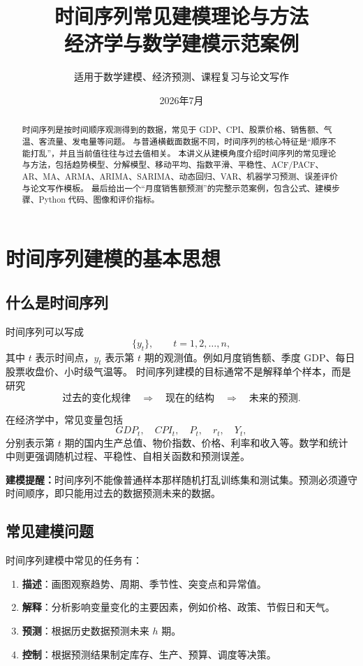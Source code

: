 \documentclass[11pt,a4paper]{ctexart}
\title{\bfseries 时间序列常见建模理论与方法\\\large 经济学与数学建模示范案例}
\author{适用于数学建模、经济预测、课程复习与论文写作}
\date{2026年7月}
\newcommand{\important}[1]{\noindent\colorbox{blue!6}{\parbox{0.97\linewidth}{#1}}}
\newcommand{\term}[1]{\textbf{#1}}
\begin{document}
\maketitle
\begin{abstract}
时间序列是按时间顺序观测得到的数据，常见于 GDP、CPI、股票价格、销售额、气温、客流量、发电量等问题。
与普通横截面数据不同，时间序列的核心特征是“顺序不能打乱”，并且当前值往往与过去值相关。
本讲义从建模角度介绍时间序列的常见理论与方法，包括趋势模型、分解模型、移动平均、指数平滑、平稳性、ACF/PACF、AR、MA、ARMA、ARIMA、SARIMA、动态回归、VAR、机器学习预测、误差评价与论文写作模板。
最后给出一个“月度销售额预测”的完整示范案例，包含公式、建模步骤、Python 代码、图像和评价指标。
\end{abstract}
\tableofcontents
\newpage

\section{时间序列建模的基本思想}
\subsection{什么是时间序列}
时间序列可以写成
\[
\{y_t\},\qquad t=1,2,\ldots,n,
\]
其中 $t$ 表示时间点，$y_t$ 表示第 $t$ 期的观测值。例如月度销售额、季度 GDP、每日股票收盘价、小时级气温等。
时间序列建模的目标通常不是解释单个样本，而是研究
\[
\text{过去的变化规律}\quad \Longrightarrow \quad \text{现在的结构}\quad \Longrightarrow \quad \text{未来的预测}.
\]

在经济学中，常见变量包括
\[
GDP_t,\quad CPI_t,\quad P_t,\quad r_t,\quad Y_t,
\]
分别表示第 $t$ 期的国内生产总值、物价指数、价格、利率和收入等。数学和统计中则更强调随机过程、平稳性、自相关函数和预测误差。

\important{\textbf{建模提醒：}时间序列不能像普通样本那样随机打乱训练集和测试集。预测必须遵守时间顺序，即只能用过去的数据预测未来的数据。}

\subsection{常见建模问题}
时间序列建模中常见的任务有：
\begin{enumerate}
  \item \term{描述}：画图观察趋势、周期、季节性、突变点和异常值。
  \item \term{解释}：分析影响变量变化的主要因素，例如价格、政策、节假日和天气。
  \item \term{预测}：根据历史数据预测未来 $h$ 期。
  \item \term{控制}：根据预测结果制定库存、生产、预算、调度等决策。
\end{enumerate}
\end{document}
